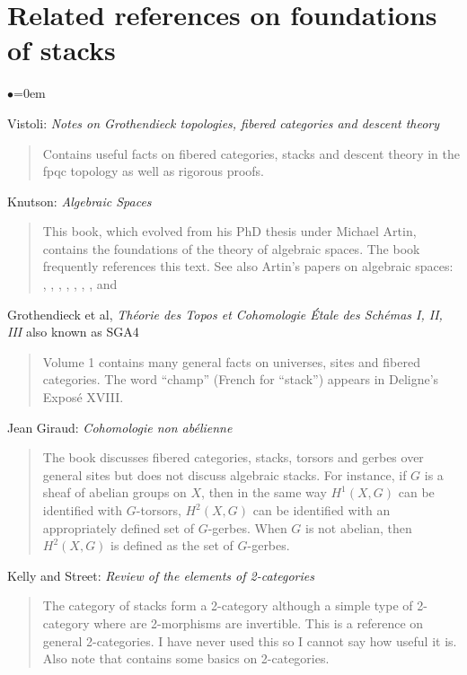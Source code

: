 \section{Related references on foundations of stacks}
\label{section-related}


\begin{list}{$\bullet$}{\leftmargin=0em}
\item
Vistoli:
\emph{Notes on Grothendieck topologies, fibered categories and descent theory}
\cite{vistoli_fga}
\begin{quote}
Contains useful facts on fibered categories, stacks and descent theory in the
fpqc topology as well as rigorous proofs.
\end{quote}
\smallskip
\item{} Knutson: \emph{Algebraic Spaces} \cite{knutson}
\begin{quote}
This book, which evolved from his PhD thesis under Michael Artin,
contains the foundations of the theory of algebraic spaces. The book
\cite{lmb} frequently references this text. See also Artin's papers on
algebraic spaces: \cite{artin_approximation},
\cite{artin_algebraizationI}, \cite{artin_implicit},
\cite{artin_algebraizationII}, \cite{artin_construction},
\cite{artin_algebraic_spaces}, \cite{artin_theorems}, and \cite{artin_versal}
\end{quote}
\smallskip
\item Grothendieck et al, \emph{Th\'eorie des Topos et Cohomologie \'Etale des
Sch\'emas I, II, III} also known as SGA4 \cite{SGA4}
\begin{quote}
Volume 1 contains many general facts on universes, sites and fibered
categories. The word ``champ'' (French for ``stack'') appears in
Deligne's Expos\'e XVIII.
\end{quote}
\smallskip
\item{} Jean Giraud: \emph{Cohomologie non ab\'elienne} \cite{giraud}
\begin{quote}
The book discusses fibered categories, stacks, torsors and gerbes over general
sites but does not discuss algebraic stacks. For instance, if $G$ is a sheaf
of abelian groups on $X$, then in the same way $H^1(X, G)$ can be identified
with $G$-torsors, $H^2(X, G)$ can be identified with an appropriately defined
set of $G$-gerbes. When $G$ is not abelian, then $H^2(X, G)$ is defined as the
set of $G$-gerbes.
\end{quote}
\smallskip
\item Kelly and Street: \emph{Review of the elements of 2-categories}
\cite{kelly-street}
\begin{quote}
The category of stacks form a 2-category although a simple type of 2-category
where are 2-morphisms are invertible. This is a reference on general
2-categories. I have never used this so I cannot say how useful it is. Also
note that \cite{stacks-project} contains some basics on 2-categories.
\end{quote}
\end{list}




